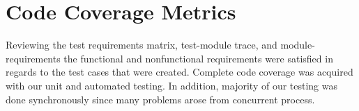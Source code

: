 \documentclass[12pt, titlepage]{article}
\begin{document}
\section{Code Coverage Metrics}
\indent \indent Reviewing the test requirements matrix, test-module trace, and module-requirements the functional and nonfunctional requirements were satisfied in regards to the test cases that were created. Complete code coverage was acquired with our unit and automated testing. In addition, majority of our testing was done synchronously since many problems arose from concurrent process.



\end{document}
